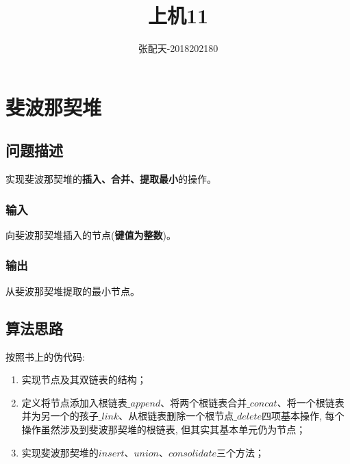 \documentclass{ctexart}[UTF8]
\title{上机11}
\author{张配天-2018202180}
\begin{document}
    \maketitle
    \tableofcontents
    \clearpage
    \section{斐波那契堆}
    \subsection{问题描述}
    实现斐波那契堆的\textbf{插入、合并、提取最小}的操作。
    \subsubsection{输入}
    向斐波那契堆插入的节点(\textbf{键值为整数})。
    \subsubsection{输出}
    从斐波那契堆提取的最小节点。
    \subsection{算法思路}
    按照书上的伪代码: \begin{enumerate}
        \item 实现节点及其双链表的结构；
        \item 定义将节点添加入根链表$\_append$、将两个根链表合并$\_concat$、将一个根链表并为另一个的孩子$\_link$、从根链表删除一个根节点$\_delete$四项基本操作, 每个操作虽然涉及到斐波那契堆的根链表, 但其实其基本单元仍为节点；
        \item 实现斐波那契堆的$insert$、$union$、$consolidate$三个方法；
    \end{enumerate}
\end{document}

